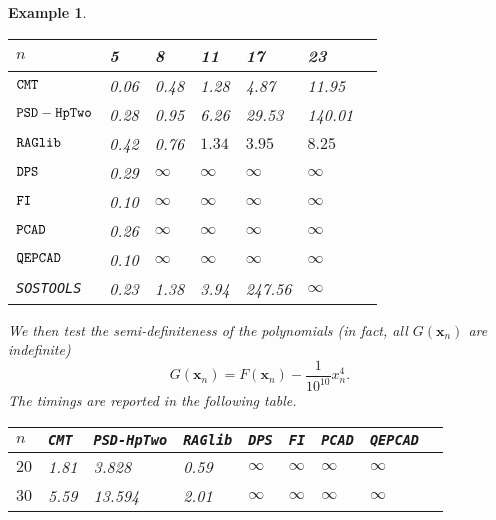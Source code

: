 \documentclass[amsthm]{elsart}
\def \Proineq {{\tt DPS}}
\def \RAGlib {{\tt RAGlib}}
\def \FI {{\tt FI}}
\def \QEPCAD {{\tt QEPCAD}}
\def \PCAD {{\tt PCAD}}
\def \TwoPro {{\tt PSD-HpTwo}}
\def \FI {{\tt FI}}
\def \QEPCAD {{\tt QEPCAD}}
\def \PCAD {{\tt PCAD}}
\def \TCPT {{\tt CMT}}
\newtheorem{ex}{Example}   \renewcommand{\algorithmicrequire}{\textsf{Input:}}
\begin{document}
\begin{ex}
        \begin{center}
                \begin{tabular}{lllllll}
                        \hline$n$ & 5 & 8& 11  & 17  &23  \\
                        \hline
            $\TCPT$          &0.06 &0.48&1.28&4.87 &11.95  \\
                        $\TwoPro$        &0.28 &0.95&6.26&29.53&140.01 \\
                        $\RAGlib$        &0.42 &0.76& $1.34$&$3.95$&$8.25$\\
                        $\Proineq$       &0.29 &$\infty$&$\infty$&$\infty$&$\infty$\\
            $\FI$            &0.10 &$\infty$ &$\infty$&$\infty$&$\infty$\\
            $\PCAD$          &0.26 &$\infty$ &$\infty$&$\infty$&$\infty$\\
            $\QEPCAD$        &0.10 &$\infty$ &$\infty$&$\infty$&$\infty$\\
            {\tt SOSTOOLS}   &0.23 & 1.38    & 3.94  & 247.56  & $\infty$\\
                        \hline
                \end{tabular}
        \end{center}

We then test the semi-definiteness of the polynomials (in fact, all $G(\bm{x}_{n})$ are indefinite)
$$G(\bm{x}_{n})=F(\bm{x}_{n})-\frac{1}{10^{10}}x_n^4.$$
The timings are reported in the following table.

        \begin{center}
                \begin{tabular}{lllllllll}
                        \hline$n$ &\TCPT& \TwoPro & \RAGlib&   \Proineq &  \FI& \PCAD&\QEPCAD\\
                        \hline
                        $20$       &1.81 &3.828&0.59& $\infty$& $\infty$&$\infty$&$\infty$\\
                        $30$       &5.59&13.594&2.01& $\infty$& $\infty$&$\infty$&$\infty$\\
           \hline
                \end{tabular}
        \end{center}
\end{ex}
\end{document}
